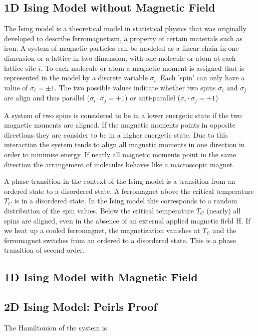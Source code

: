 \subsection{1D Ising Model without Magnetic Field}
The Ising model is a theoretical model in statistical physics that was originally developed
to describe ferromagnetism, a property of certain materials such as iron. A system of magnetic particles can be modeled as a linear
chain in one dimension or a lattice in two dimension, with one molecule or atom at each
lattice site $i$. To each molecule or atom a magnetic moment is assigned that is represented
in the model by a discrete variable $\sigma_i$. Each 'spin' can only have a value of $\sigma_i = \pm 1$.
The two possible values indicate whether two spins $\sigma_i$ and $\sigma_j$ are align and thus parallel
($\sigma_i \cdot \sigma_j = +1$) or anti-parallel ($\sigma_i \cdot \sigma_j = +1$)

A system of two spins is considered to be in a lower energetic state if the two magnetic
moments are aligned. If the magnetic moments points in opposite directions they are
consider to be in a higher energetic state. Due to this interaction the system tends to
align all magnetic moments in one direction in order to minimise energy. If nearly all
magnetic moments point in the same direction the arrangement of molecules behaves like
a macroscopic magnet.

A phase transition in the context of the Ising model is a transition from an ordered state
to a disordered state. A ferromagnet above the critical temperature $T_C$ is in a disordered
state. In the Ising model this corresponds to a random distribution of the spin values.
Below the critical temperature $T_C$ (nearly) all spins are aligned, even in the absence of an
external applied magnetic field H. If we heat up a cooled ferromagnet, the magnetization
vanishes at $T_C$ and the ferromagnet switches from an ordered to a disordered state. This
is a phase transition of second order.


\subsection{1D Ising Model with Magnetic Field}

\subsection{2D Ising Model: Peirls Proof}
The Hamiltonion of the system is 
\[ \]

